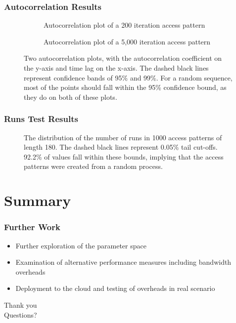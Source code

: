 \documentclass{beamer}
\begin{document}
\begin{frame}
    \frametitle{Autocorrelation Results}
    \begin{figure}
        \centering
        \begin{subfigure}{0.5\textwidth}
            \centering
            \scalebox{0.4}{}
            \caption{Autocorrelation plot of a 200 iteration access pattern}
            \label{fig:shortAutocorr}
        \end{subfigure}%
        \begin{subfigure}{0.5\textwidth}
            \centering
            \scalebox{0.4}{}
            \caption{Autocorrelation plot of a 5,000 iteration access pattern}
            \label{fig:longAutocorr}
        \end{subfigure}
        \caption{Two autocorrelation plots, with the autocorrelation coefficient on the y-axis and time lag on the x-axis. The dashed black lines represent confidence bands of 95\% and 99\%. For a random sequence, most of the points should fall within the 95\% confidence bound, as they do on both of these plots.}
        \label{fig:autocorr}
    \end{figure}
\end{frame}

\begin{frame}
    \frametitle{Runs Test Results}
    \begin{figure}
        \centering
        \scalebox{0.5}{}
        \caption{The distribution of the number of runs in 1000 access patterns of length 180. The dashed black lines represent 0.05\% tail cut-offs. 92.2\% of values fall within these bounds, implying that the access patterns were created from a random process.}
        \label{fig:runsTestPlot}
    \end{figure}
\end{frame}

\section{Summary}

\begin{frame}
    \frametitle{Further Work}
    \begin{itemize}
        \item Further exploration of the parameter space
        \item Examination of alternative performance measures including bandwidth overheads
        \item Deployment to the cloud and testing of overheads in real scenario
    \end{itemize}
\end{frame}

\begin{frame}[plain]
    \begin{center}
        \huge Thank you \\ Questions?
    \end{center}
\end{frame}
\end{document}
